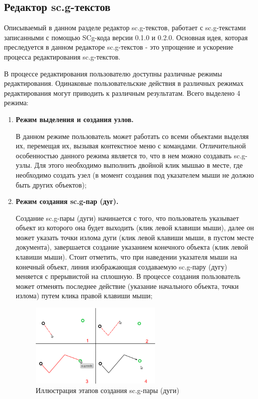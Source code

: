 
\subsection{Редактор sc.g-текстов}

Описываемый в данном разделе редактор sc.g-текстов, работает с sc.g-текстами записанными с помощью SCg-кода версии 0.1.0 и 0.2.0.
Основная идея, которая преследуется в данном редакторе sc.g-текстов - это упрощение и ускорение процесса редактирования sc.g-текстов.
 
В процессе редактирования пользователю доступны различные режимы редактирования. Одинаковые пользовательские действия в различных
режимах редактирования могут приводить к различным результатам. Всего выделено 4 режима:

\begin{enumerate}
 \item \textbf{Режим выделения и создания узлов.}
 
 В данном режиме пользователь может работать со всеми объектами выделяя их, перемещая их, вызывая контекстное меню с командами. 
 Отличительной особенностью данного режима является то, что в нем можно создавать {\sf sc.g-узлы}. 
 Для этого необходимо выполнить двойной клик мышью в месте, где необходимо создать узел 
 (в момент создания под указателем мыши не должно быть других объектов);
 \item \textbf{Режим создания sc.g-пар (дуг).} 
 
 Создание sc.g-пары (дуги) начинается с того, что пользователь указывает объект из которого она будет выходить (клик левой клавиши мыши), 
 далее он может указать точки излома дуги (клик левой клавиши мыши, в пустом месте документа), 
 завершается создание указанием конечного объекта (клик левой клавиши мыши). Стоит отметить, что при наведении указателя мыши
 на конечный объект, линия изображающая создаваемую sc.g-пару (дугу) меняется с прерывистой на сплошную.
 В процессе создания пользователь может отменять последнее действие (указание начального объекта, точки излома) путем клика правой клавиши мыши;
 \begin{figure}[H]
    \begin{center}
     	\includegraphics[width=0.6\textwidth]{../images/scg/scg-create-pair.png}
	\caption{Иллюстрация этапов создания sc.g-пары (дуги)}
	\label{scg_illustration_create_pair}
    \end{center}
 \end{figure}
 

\end{enumerate}
